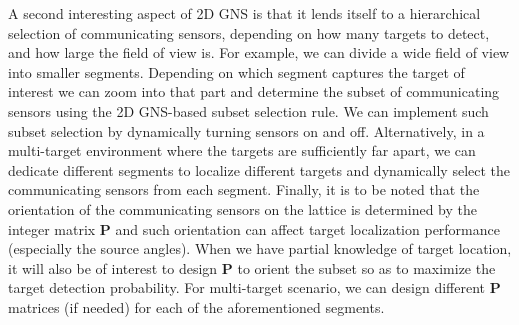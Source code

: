 A second interesting aspect of 2D GNS is that it lends itself to a hierarchical selection of communicating sensors, depending on how many targets to detect, and how large the field of view is. For example, we can divide a wide field of view into smaller segments. Depending on which segment captures the target of interest 
we can zoom into that part and determine the subset of communicating sensors using the 2D GNS-based subset selection rule. We can implement such subset selection by dynamically turning sensors on and off. Alternatively, in a multi-target environment where the targets are sufficiently far apart, we can dedicate different segments to localize different targets and dynamically select the communicating sensors from each segment. Finally, it is to be noted that the orientation of the communicating sensors on the lattice is determined by the integer matrix $\mathbf{P}$ and such orientation can affect target localization performance (especially the source angles). When we have partial knowledge of target location, it will also be of interest to design $\mathbf{P}$ to orient the subset so as to maximize the target detection probability. For multi-target scenario, we can design different $\mathbf{P}$ matrices (if needed) for each of the aforementioned segments.







